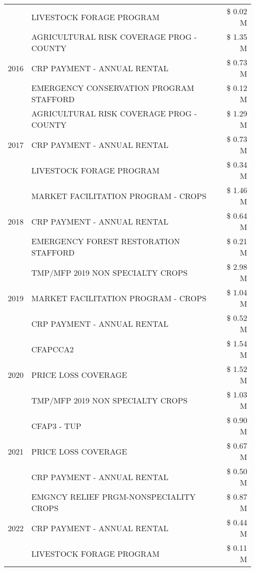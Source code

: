 \begin{tabular}{llr}
 & LIVESTOCK FORAGE PROGRAM & \$ 0.02 M \\
\cline{1-3}
\multirow[t]{3}{*}{2016} & AGRICULTURAL RISK COVERAGE PROG - COUNTY & \$ 1.35 M \\
 & CRP PAYMENT - ANNUAL RENTAL & \$ 0.73 M \\
 & EMERGENCY CONSERVATION PROGRAM STAFFORD & \$ 0.12 M \\
\cline{1-3}
\multirow[t]{3}{*}{2017} & AGRICULTURAL RISK COVERAGE PROG - COUNTY & \$ 1.29 M \\
 & CRP PAYMENT - ANNUAL RENTAL & \$ 0.73 M \\
 & LIVESTOCK FORAGE PROGRAM & \$ 0.34 M \\
\cline{1-3}
\multirow[t]{3}{*}{2018} & MARKET FACILITATION PROGRAM - CROPS & \$ 1.46 M \\
 & CRP PAYMENT - ANNUAL RENTAL & \$ 0.64 M \\
 & EMERGENCY FOREST RESTORATION STAFFORD & \$ 0.21 M \\
\cline{1-3}
\multirow[t]{3}{*}{2019} & TMP/MFP 2019 NON SPECIALTY CROPS & \$ 2.98 M \\
 & MARKET FACILITATION PROGRAM - CROPS & \$ 1.04 M \\
 & CRP PAYMENT - ANNUAL RENTAL & \$ 0.52 M \\
\cline{1-3}
\multirow[t]{3}{*}{2020} & CFAPCCA2 & \$ 1.54 M \\
 & PRICE LOSS COVERAGE & \$ 1.52 M \\
 & TMP/MFP 2019 NON SPECIALTY CROPS & \$ 1.03 M \\
\cline{1-3}
\multirow[t]{3}{*}{2021} & CFAP3 - TUP & \$ 0.90 M \\
 & PRICE LOSS COVERAGE & \$ 0.67 M \\
 & CRP PAYMENT - ANNUAL RENTAL & \$ 0.50 M \\
\cline{1-3}
\multirow[t]{3}{*}{2022} & EMGNCY RELIEF PRGM-NONSPECIALITY CROPS & \$ 0.87 M \\
 & CRP PAYMENT - ANNUAL RENTAL & \$ 0.44 M \\
 & LIVESTOCK FORAGE PROGRAM & \$ 0.11 M \\
\cline{1-3}
\bottomrule
\end{tabular}
